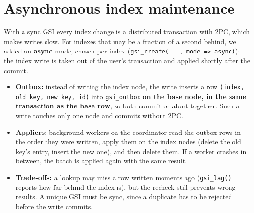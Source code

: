 \documentclass[11pt,a4paper]{article}
\begin{document}
\section{Asynchronous index maintenance}\label{sec:async}
With a sync GSI every index change is a distributed transaction with 2PC, which makes writes slow. For
indexes that may be a fraction of a second behind, we added an \textbf{async} mode, chosen per index
(\texttt{gsi\_create(..., mode => \textquotesingle{}async\textquotesingle{})}): the index write is taken
out of the user's transaction and applied shortly after the commit.
\begin{itemize}
  \item \textbf{Outbox:} instead of writing the index node, the write inserts a row
        \texttt{(index, old key, new key, id)} into \texttt{gsi\_outbox} \textbf{on the base node, in the
        same transaction as the base row}, so both commit or abort together. Such a write touches only
        one node and commits without 2PC.
  \item \textbf{Appliers:} background workers on the coordinator read the outbox rows in the order they
        were written, apply them on the index nodes (delete the old key's entry, insert the new one), and
        then delete them. If a worker crashes in between, the batch is applied again with the same result.
  \item \textbf{Trade-offs:} a lookup may miss a row written moments ago (\texttt{gsi\_lag()} reports how
        far behind the index is), but the recheck still prevents wrong results. A unique GSI must be sync,
        since a duplicate has to be rejected before the write commits.
\end{itemize}
\end{document}

